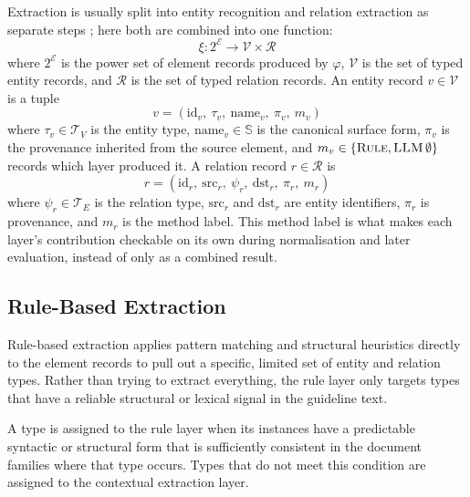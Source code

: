 Extraction is usually split into entity recognition and relation extraction as separate steps \cite{nasar2021}; here both are combined into one function:
\begin{equation}
\xi: 2^{\mathcal{E}} \rightarrow \mathcal{V} \times \mathcal{R}
\label{eq:extraction}
\end{equation}
where $2^{\mathcal{E}}$ is the power set of element records produced by $\varphi$, $\mathcal{V}$ is the set of typed entity records, and $\mathcal{R}$ is the set of typed relation records. An entity record $v \in \mathcal{V}$ is a tuple
$$v = (\text{id}_v,\ \tau_v,\ \text{name}_v,\ \pi_v,\ m_v)$$
where $\tau_v \in \mathcal{T}_V$ is the entity type, $\text{name}_v \in \mathbb{S}$ is the canonical surface form, $\pi_v$ is the provenance inherited from the source element, and $m_v \in \{\textsc{Rule}, \textsc{LLM}\, \emptyset\}$ records which layer produced it. A relation record $r \in \mathcal{R}$ is
$$r = (\text{id}_r,\ \text{src}_r,\ \psi_r,\ \text{dst}_r,\ \pi_r,\ m_r)$$
where $\psi_r \in \mathcal{T}_E$ is the relation type, $\text{src}_r$ and $\text{dst}_r$ are entity identifiers, $\pi_r$ is provenance, and $m_r$ is the method label. This method label is what makes each layer's contribution checkable on its own during normalisation and later evaluation, instead of only as a combined result.

\subsection{Rule-Based Extraction}
\label{sec:rule-extraction}

Rule-based extraction applies pattern matching and structural heuristics directly to the element records to pull out a specific, limited set of entity and relation types. Rather than trying to extract everything, the rule layer only targets types that have a reliable structural or lexical signal in the guideline text.

A type is assigned to the rule layer when its instances have a predictable
syntactic or structural form that is sufficiently consistent in the
document families where that type occurs. Types that do not meet this
condition are assigned to the contextual extraction layer.

